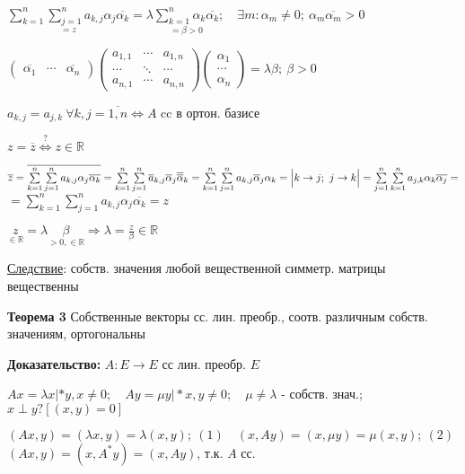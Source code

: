$\underset{=z}{\sum\limits_{k=1}^n \sum\limits_{j=1}^n a_{k,j} \alpha_j \overline{\alpha_k}} = \lambda \underset{=\beta > 0}{\sum\limits_{k=1}^n\alpha_k \overline{\alpha_k}};\quad \exists m : \alpha_m \ne 0;\ \alpha_m \overline{\alpha_m} > 0$

$\begin{pmatrix} \overline{\alpha_1} & \cdots & \overline{\alpha_n} \end{pmatrix} \begin{pmatrix} a_{1,1} & \cdots & a_{1,n} \\ \cdots & \ddots & \cdots \\ a_{n,1} & \cdots & a_{n,n} \end{pmatrix} \begin{pmatrix} \alpha_1 \\ \cdots \\ \alpha_n \end{pmatrix}
 = \lambda \beta;\ \beta > 0$

$a_{k,j} = a_{j,k}\ \forall k,j=\overline{1,n} \Leftrightarrow A $ cc в ортон. базисе

$z = \overline{z} \overset{?} \Leftrightarrow z \in \mathbb{R}$

$\overline{z} = \overline{\sum\limits_{k=1}^n \sum\limits_{j=1}^n a_{k,j} \alpha_j \overline{\alpha_k}} = \sum\limits_{k=1}^n \sum\limits_{j=1}^n \overline{a}_{k,j} \overline{\alpha}_j \overline{\overline{\alpha}}_k = 
\sum\limits_{k=1}^n \sum\limits_{j=1}^n a_{k,j} \overline{\alpha}_j \alpha_k = \Bigl| k\to j;\ j \to k \Bigr| = \sum\limits_{j=1}^n \sum\limits_{k=1}^n a_{j,k} \alpha_k \overline{\alpha_j}=$\\
$=\sum\limits_{k=1}^n \sum\limits_{j=1}^n a_{k,j} \alpha_j \overline{\alpha_k} = z$

$\underset{\in \mathbb{R}} z = \lambda \underset{>0, \in \mathbb{R}} \beta \Rightarrow \lambda = \frac{z}{\beta} \in \mathbb{R}$

\underline{Следствие}: собств. значения любой вещественной симметр. матрицы вещественны 

\textbf{Теорема 3} Собственные векторы сс. лин. преобр., соотв. различным собств. значениям, ортогональны

\textbf{Доказательство:} $A:E\to E$ сс лин. преобр. $E$

$Ax = \lambda x |*y, x\ne 0;\quad Ay = \mu y |*x, y\ne 0;\quad \mu \ne \lambda$ - собств. знач.; $x \perp y ? [(x,y)=0]$

$(Ax, y) = (\lambda x, y) = \lambda(x,y);\ (1)\quad (x, Ay) = (x, \mu y) = \mu (x,y);\ (2)$\\$  (Ax, y) = (x, A^*y) = (x,Ay)$, т.к. $A$ сс.

